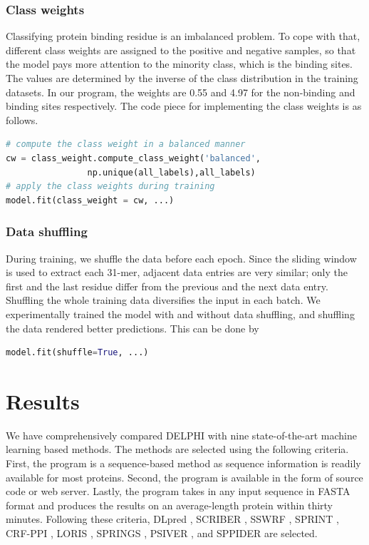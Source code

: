 \subsubsection{Class weights}
Classifying protein binding residue is an imbalanced problem. To cope with that, different class weights \cite{ting2002instance} are assigned to the positive and negative samples, so that the model pays more attention to the minority class, which is the binding sites.  The values are determined by the inverse of the class distribution in the training datasets. In our program, the weights are 0.55 and 4.97 for the non-binding and binding sites respectively. The code piece for implementing the class weights is as follows.
\begin{lstlisting}[language=python,frame=single,basicstyle=\small]
# compute the class weight in a balanced manner
cw = class_weight.compute_class_weight('balanced',
                np.unique(all_labels),all_labels)
# apply the class weights during training
model.fit(class_weight = cw, ...)
\end{lstlisting}

\subsubsection{Data shuffling}
During training, we shuffle the data before each epoch. Since the sliding window is used to extract each 31-mer, adjacent data entries are very similar; only the first and the last residue differ from the previous and the next data entry. Shuffling the whole training data diversifies the input in each batch. We experimentally trained the model with and without data shuffling, and shuffling the data rendered better predictions. This can be done by 
\begin{lstlisting}[language=python,frame=single]
  model.fit(shuffle=True, ...)
\end{lstlisting}

\section{Results}
We have comprehensively compared DELPHI with nine state-of-the-art machine learning based methods. The methods are selected using the following criteria. First, the program is a sequence-based method as sequence information is readily available for most proteins. Second, the program is available in the form of source code or web server. Lastly, the program takes in any input sequence in FASTA format and produces the results on an average-length protein within thirty minutes. Following these criteria, DLpred \cite{zhang2019sequence}, SCRIBER \cite{zhang2019scriber}, SSWRF \cite{wei2016protein}, SPRINT \cite{taherzadeh2016sequence}, CRF-PPI \cite{wei2015cascade}, LORIS \cite{dhole2014sequence}, SPRINGS \cite{singh2014springs}, PSIVER \cite{murakami2010applying}, and SPPIDER \cite{porollo2007prediction} are selected.


